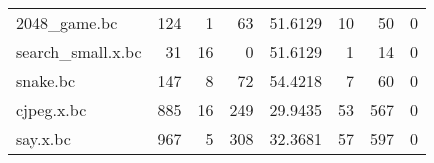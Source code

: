 \begin{table}[ht]
\begin{adjustbox}{width=1.3\textwidth}
\begin{tabular}{lrrrrrrr}
 2048\_game.bc         &                124 &                     1 &                          63 &               51.6129  &                    10 &                        50 &                             0 \\
 search\_small.x.bc    &                 31 &                    16 &                           0 &               51.6129  &                     1 &                        14 &                             0 \\
 snake.bc             &                147 &                     8 &                          72 &               54.4218  &                     7 &                        60 &                             0 \\
 cjpeg.x.bc           &                885 &                    16 &                         249 &               29.9435  &                    53 &                       567 &                             0 \\
 say.x.bc             &                967 &                     5 &                         308 &               32.3681  &                    57 &                       597 &                             0 \\
\hline
\end{tabular}

\end{adjustbox}
\end{table}

